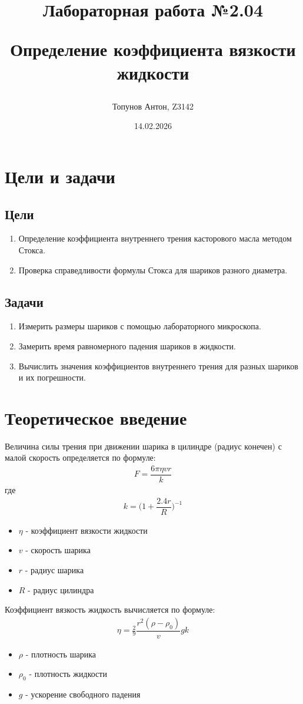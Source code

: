 \documentclass{article}
\title{Лабораторная работа №2.04

Определение коэффициента вязкости жидкости
}
\author{Топунов Антон, Z3142}
\date{14.02.2026}
\begin{document}
\maketitle
\clearpage
\section{Цели и задачи}
\subsection{Цели}
\begin{enumerate}
    \item Определение коэффициента внутреннего трения касторового масла методом Стокса.
    \item Проверка справедливости формулы Стокса для шариков разного диаметра.
\end{enumerate}
\subsection{Задачи}
\begin{enumerate}
    \item Измерить размеры шариков с помощью лабораторного микроскопа.
    \item Замерить время равномерного падения шариков в жидкости.
    \item Вычислить значения коэффициентов внутреннего трения для разных шариков и их погрешности.
\end{enumerate}
\section{Теоретическое введение}
Величина силы трения при движении шарика в цилиндре (радиус конечен)
с малой скорость определяется по формуле:
\begin{gather*}
    F=\dfrac{ 6\pi\eta vr}{k } 
\end{gather*}
где
\begin{gather*}
    k=\bigg(1+\dfrac{ 2.4r}{ R} \bigg)^{ -1}
\end{gather*}
\begin{itemize}
    \item $\eta$ - коэффициент вязкости жидкости
    \item $v$ - скорость шарика
    \item $r$ - радиус шарика
    \item $R$ - радиус цилиндра 
\end{itemize}
Коэффициент вязкость жидкость вычисляется по формуле:
\begin{gather*}
    \eta = \frac{ 2}{ 9}\dfrac{r^{ 2}(\rho-\rho_{ 0})}{v}gk
\end{gather*}
\begin{itemize}
    \item $\rho$ - плотность шарика
    \item $\rho_{ 0}$ - плотность жидкости
    \item $g$ - ускорение свободного падения
\end{itemize}
\end{document}

